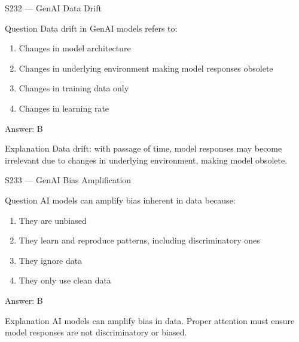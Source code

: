 \documentclass[aspectratio=169,8pt]{beamer}
\begin{document}
	\begin{frame}{S232 --- GenAI Data Drift}
		\begin{block}{Question}
			Data drift in GenAI models refers to:
			\begin{enumerate}
				\item Changes in model architecture
				\item Changes in underlying environment making model responses obsolete
				\item Changes in training data only
				\item Changes in learning rate
			\end{enumerate}
		\end{block}
		\begin{exampleblock}{Answer: B}\end{exampleblock}
		\begin{block}{Explanation}
			Data drift: with passage of time, model responses may become irrelevant due to changes in underlying environment, making model obsolete.
		\end{block}
	\end{frame}
	
	\begin{frame}{S233 --- GenAI Bias Amplification}
		\begin{block}{Question}
			AI models can amplify bias inherent in data because:
			\begin{enumerate}
				\item They are unbiased
				\item They learn and reproduce patterns, including discriminatory ones
				\item They ignore data
				\item They only use clean data
			\end{enumerate}
		\end{block}
		\begin{exampleblock}{Answer: B}\end{exampleblock}
		\begin{block}{Explanation}
			AI models can amplify bias in data. Proper attention must ensure model responses are not discriminatory or biased.
		\end{block}
	\end{frame}
	
\end{document}
